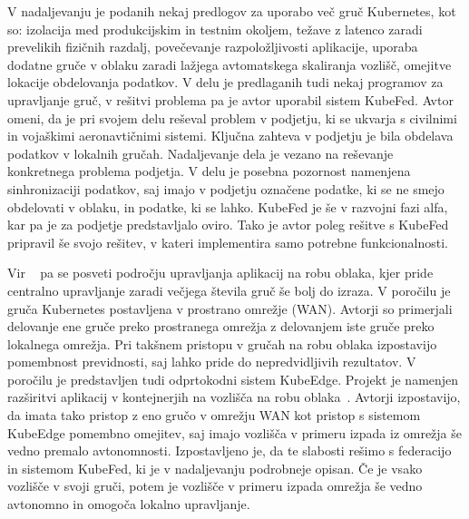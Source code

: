 \documentclass[a4paper, 12pt]{book}
\begin{document}
V nadaljevanju je podanih nekaj predlogov za uporabo več gruč Kubernetes, kot so: izolacija med produkcijskim in testnim okoljem, težave z latenco zaradi prevelikih fizičnih razdalj, povečevanje razpoložljivosti aplikacije, uporaba dodatne gruče v oblaku zaradi lažjega avtomatskega skaliranja vozlišč, omejitve lokacije obdelovanja podatkov.
V delu je predlaganih tudi nekaj programov za upravljanje gruč, v rešitvi problema pa je avtor uporabil sistem KubeFed.
Avtor omeni, da je pri svojem delu reševal problem v podjetju, ki se ukvarja s civilnimi in vojaškimi aeronavtičnimi sistemi.
Ključna zahteva v podjetju je bila obdelava podatkov v lokalnih gručah.
Nadaljevanje dela je vezano na reševanje konkretnega problema podjetja.
V delu je posebna pozornost namenjena sinhronizaciji podatkov, saj imajo v podjetju označene podatke, ki se ne smejo obdelovati v oblaku, in podatke, ki se lahko.
KubeFed je še v razvojni fazi alfa, kar pa je za podjetje predstavljalo oviro.
Tako je avtor poleg rešitve s KubeFed pripravil še svojo rešitev, v kateri implementira samo potrebne funkcionalnosti.

Vir ~\cite{kube-and-edge} pa se posveti področju upravljanja aplikacij na robu oblaka, kjer pride centralno upravljanje zaradi večjega števila gruč še bolj do izraza.
V poročilu je gruča Kubernetes postavljena v prostrano omrežje (WAN).
Avtorji so primerjali delovanje ene gruče preko prostranega omrežja z delovanjem iste gruče preko lokalnega omrežja.
Pri takšnem pristopu v gručah na robu oblaka izpostavijo pomembnost previdnosti, saj lahko pride do nepredvidljivih rezultatov.
V poročilu je predstavljen tudi odprtokodni sistem KubeEdge.
Projekt je namenjen razširitvi aplikacij v kontejnerjih na vozlišča na robu oblaka~\cite{kubeedge}.
Avtorji izpostavijo, da imata tako pristop z eno gručo v omrežju WAN kot pristop s sistemom KubeEdge pomembno omejitev, saj imajo vozlišča v primeru izpada iz omrežja še vedno premalo avtonomnosti.
Izpostavljeno je, da te slabosti rešimo s federacijo in sistemom KubeFed, ki je v nadaljevanju podrobneje opisan.
Če je vsako vozlišče v svoji gruči, potem je vozlišče v primeru izpada omrežja še vedno avtonomno in omogoča lokalno upravljanje.
\end{document}
